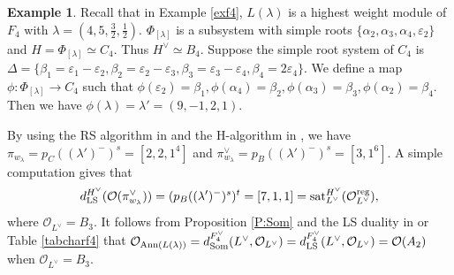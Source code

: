 \documentclass[reqno,12pt]{amsart}
\numberwithin{equation}{section}
\theoremstyle{plain}
\theoremstyle{definition}
\newtheorem{ex}[Thm]{Example}
\newcommand{\lam}{\lambda}
\newcommand{\ep}{\varepsilon}
\newcommand{\Ann}{\mathrm{Ann}}
\newcommand{\aff}{ \mathbf{a} }
\newcommand{\gkd}{\operatorname{GKdim}}
\begin{document}
\begin{ex}Recall that in Example \ref{exf4},
	 $L(\lam)$ is a highest weight module of $F_4$ with  $\lambda=(4, 5, \frac{3}{2}, \frac{1}{2})$.  $\Phi_{[\lambda]}$ is a subsystem with simple roots $\{\alpha_2, \alpha_3, \alpha_4, \ep_2\}$ and $H=\Phi_{[\lambda]}\simeq C_4$. Thus  $H^\vee \simeq B_4$. Suppose the simple root system of $C_4$ is $\Delta=\{\beta_1=\ep_1-\ep_2, \beta_2=\ep_2-\ep_3, \beta_3=\ep_3-\ep_4,\beta_4=2\ep_4\}$. We define a map $\phi: \Phi_{[\lambda]} \rightarrow C_4$ such that $\phi(\varepsilon_2)=\beta_1, \phi(\alpha_4)=\beta_2, \phi(\alpha_3)=\beta_3, \phi(\alpha_2)=\beta_4$. Then we have $\phi(\lam)=\lam'=(9,-1,2,1)$. 
 
 



By using the RS algorithm in \cite{BXX} and the H-algorithm in \cite{BMW}, we have  $\pi_{w_\lambda}=p_C((\lam')^-)^s=[2,2,1^4]$ and $\pi^{\vee}_{w_\lambda}=p_B((\lam')^-)^s=[3,1^6]$.   A simple computation gives that
$$d_{\rm LS}^{H^\vee}(\mathcal{O}(\pi^{\vee}_{w_\lambda}))=(p_B((\lam')^-)^s)^t= [7,1,1] = {\rm sat}_{L^\vee}^{H^\vee} (\mathcal{O}_{L^\vee}^{\rm reg}),$$
where $\mathcal{O}_{L^\vee} = B_3$.
It follows from Proposition \ref{P:Som} and the LS duality in \cite[p. 440]{Ca85} or Table \ref{tabcharf4} that $\mathcal{O}_{{\rm Ann}(L(\lambda))} = d_{\rm Som}^{F_4^\vee}(L^{\vee}, \mathcal{O}_{L^\vee}) = d_{\rm LS}^{F_4^\vee}(L^{\vee}, \mathcal{O}_{L^\vee}) =\mathcal{O}(A_2)$ when $\mathcal{O}_{L^\vee}=B_3$.
\end{ex}
\end{document}
